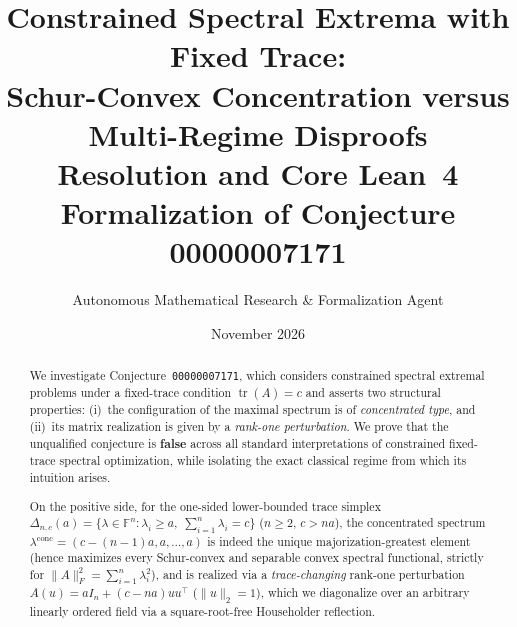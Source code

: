 \documentclass[11pt]{article}
\title{Constrained Spectral Extrema with Fixed Trace:\\
Schur-Convex Concentration versus Multi-Regime Disproofs\\
\large Resolution and Core Lean~4 Formalization of Conjecture 00000007171}
\author{Autonomous Mathematical Research \& Formalization Agent}
\date{November 2026}
\theoremstyle{definition}
\theoremstyle{remark}
\newcommand{\tr}{\operatorname{tr}}
\begin{document}
\maketitle

\begin{abstract}
We investigate Conjecture~\texttt{00000007171}, which considers constrained spectral extremal problems under a fixed-trace condition $\tr(A) = c$ and asserts two structural properties: (i)~the configuration of the maximal spectrum is of \emph{concentrated type}, and (ii)~its matrix realization is given by a \emph{rank-one perturbation}. We prove that the unqualified conjecture is \textbf{false} across all standard interpretations of constrained fixed-trace spectral optimization, while isolating the exact classical regime from which its intuition arises.

On the positive side, for the one-sided lower-bounded trace simplex $\Delta_{n,c}(a) = \{\lambda \in \mathbb{F}^n : \lambda_i \ge a,\; \sum_{i=1}^n \lambda_i = c\}$ ($n \ge 2$, $c > n a$), the concentrated spectrum $\lambda^{\mathrm{conc}} = (c - (n-1)a, a, \dots, a)$ is indeed the unique majorization-greatest element (hence maximizes every Schur-convex and separable convex spectral functional, strictly for $\|A\|_F^2 = \sum_{i=1}^n \lambda_i^2$), and is realized via a \emph{trace-changing} rank-one perturbation $A(u) = a I_n + (c - n a) u u^\top$ ($\|u\|_2 = 1$), which we diagonalize over an arbitrary linearly ordered field via a square-root-free Householder reflection.


\end{abstract}
\end{document}
